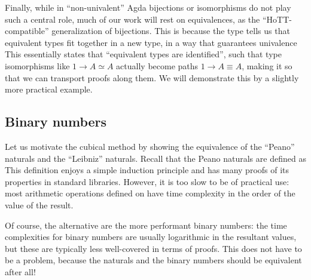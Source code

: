 Finally, while in ``non-univalent'' Agda bijections or isomorphisms do not play such a central role, much of our work will rest on equivalences, as the ``HoTT-compatible'' generalization of bijections. This is because the  type tells us that equivalent types fit together in a new type, in a way that guarantees univalence
This essentially states that ``equivalent types are identified'', such that type isomorphisms like $1 \to A \simeq A$ actually become paths $1 \to A \equiv A$, making it so that we can transport proofs along them. We will demonstrate this by a slightly more practical example.


\subsection{Binary numbers}\label{ssec:binary}
Let us motivate the cubical method by showing the equivalence of the ``Peano'' naturals and the ``Leibniz'' naturals. Recall that the Peano naturals are defined as 
This definition enjoys a simple induction principle and has many proofs of its properties in standard libraries. However, it is too slow to be of practical use: most arithmetic operations defined on \bN{} have time complexity in the order of the value of the result.

Of course, the alternative are the more performant binary numbers: the time complexities for binary numbers are usually logarithmic in the resultant values, but these are typically less well-covered in terms of proofs. This does not have to be a problem, because the \bN{} naturals and the binary numbers should be equivalent after all!

